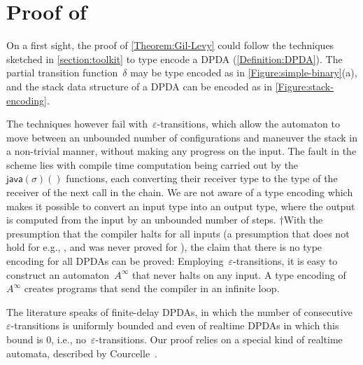 \documentclass[a4paper,USenglish]{lipics-v2016}
\def\ReplaceInThesis#1#2{#1}
\begin{document}
\section{Proof of }
\label{section:proof}
On a first sight, the proof of \cref{Theorem:Gil-Levy} could follow the techniques
  sketched in \cref{section:toolkit} to type encode a DPDA (\cref{Definition:DPDA}).
  The partial transition function~$δ$ may be type encoded as in \ReplaceInThesis{\cref{Figure:simple-binary}(a)}{\cref{Figure:simple-binary-a}},
and the stack data structure of a DPDA can be encoded as in \cref{Figure:stack-encoding\ReplaceInThesis{}{-b}}.

The techniques however fail with~$ε$-transitions,
  which allow the automaton to move between an unbounded number of
  configurations and maneuver the stack in a non-trivial manner,
  without making any progress on the input.
The fault in the scheme lies with compile time computation being carried out
  by the~$\textsf{java}(σ)()$ functions, each converting
  their receiver type to the type of the receiver of the next call in the chain.
We are not aware of a \Java type encoding which makes
  it possible to convert an input type into an output type, where
  the output is computed from the input by an unbounded number of steps.
  †{With the presumption that the \Java compiler halts for all inputs (a presumption that does
    not hold for e.g., \CC, and was never proved for \Java), the claim that there is no \Java 
    type encoding for all DPDAs can be proved:
    Employing~$ε$-transitions, it is easy to construct an automaton~$A^∞$ that
    never halts on any input.
    A type encoding of~$A^∞$ creates programs that send the compiler in an infinite loop.
  }

The literature speaks of finite-delay DPDAs, in which the number
  of consecutive~$ε$-transitions is uniformly bounded and even of
  realtime DPDAs in which this bound is 0, i.e., no~$ε$-transitions.
Our proof relies on a special kind of realtime automata,
  described by Courcelle~\cite{Courcelle:77}.
\end{document}
